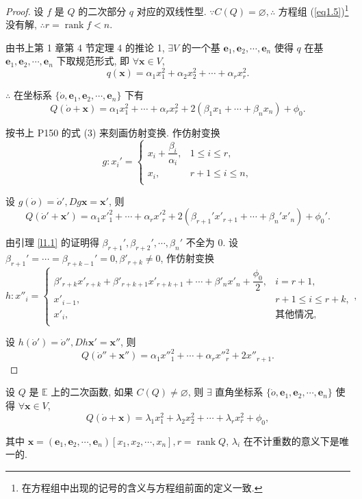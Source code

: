 \documentclass{ctexart}
\begin{document}
\begin{proof}
    设 $f$ 是 $Q$ 的二次部分 $q$ 对应的双线性型. $\because C(Q)=\varnothing,\therefore$ 方程组 (\ref{eq1.5})\footnote{在方程组中出现的记号的含义与方程组前面的定义一致.} 没有解, $\therefore r=\operatorname{rank}f<n$.

    由书上第 1 章第 4 节定理 4 的推论 1, $\exists V$ 的一个基 $\boldsymbol{e}_1,\boldsymbol{e}_2,\cdots,\boldsymbol{e}_n$ 使得 $q$ 在基 $\boldsymbol{e}_1,\boldsymbol{e}_2,\cdots,\boldsymbol{e}_n$ 下取规范形式, 即 $\forall\boldsymbol{x}\in V$,
    \[q(\boldsymbol{x})=\alpha_1x^2_1+\alpha_2x^2_2+\cdots+\alpha_rx^2_r.\]

    $\therefore$ 在坐标系 $\{\dot{o},\boldsymbol{e}_1,\boldsymbol{e}_2,\cdots,\boldsymbol{e}_n\}$ 下有
    \[Q(\dot{o}+\boldsymbol{x})=\alpha_1x^2_1+\cdots+\alpha_rx^2_r+2(\beta_1x_1+\cdots+\beta_nx_n)+\phi_0.\]

    按书上 P150 的式 (3) 来刻画仿射变换. 作仿射变换
    \[g:x_i'=\begin{cases}
        x_i+\dfrac{\beta_i}{\alpha_i}, & 1\leq i\leq r, \\
        x_i, & r+1\leq i\leq n, \\
    \end{cases}\]

    设 $g(\dot{o})=\dot{o}',Dg\boldsymbol{x}=\boldsymbol{x}'$, 则
    \[Q(\dot{o}'+\boldsymbol{x}')=\alpha_1x'^2_1+\cdots+\alpha_rx'^2_r+2(\beta_{r+1}'x'_{r+1}+\cdots+\beta_n'x'_n)+\phi_0'.\]

    由引理 \ref{l1.1} 的证明得 $\beta_{r+1}',\beta_{r+2}',\cdots,\beta_n'$ 不全为 $0$. 设 $\beta_{r+1}'=\cdots=\beta_{r+k-1}'=0,\beta'_{r+k}\neq0$, 作仿射变换
    \[h:x''_i=\begin{cases}
        \beta'_{r+k}x'_{r+k}+\beta'_{r+k+1}x'_{r+k+1}+\cdots+\beta'_nx'_n+\dfrac{\phi_0}{2}, & i=r+1, \\
        x'_{i-1}, & r+1\leq i\leq r+k, \\
        x'_i, & \text{其他情况}, \\
    \end{cases},\]

    设 $h(\dot{o}')=\dot{o}'',Dh\boldsymbol{x}'=\boldsymbol{x}''$, 则
    \[Q(\dot{o}''+\boldsymbol{x}'')=\alpha_1x''^2_1+\cdots+\alpha_rx''^2_r+2x''_{r+1}.\]
\end{proof}
\begin{theorem}
    设 $Q$ 是 $\mathbb{E}$ 上的二次函数, 如果 $C(Q)\neq\varnothing$, 则 $\exists$ 直角坐标系 $\{\dot{o},\boldsymbol{e}_1,\boldsymbol{e}_2,\cdots,\boldsymbol{e}_n\}$ 使得 $\forall\boldsymbol{x}\in V$,
    \[Q(\dot{o}+\boldsymbol{x})=\lambda_1x^2_1+\lambda_2x^2_2+\cdots+\lambda_rx^2_r+\phi_0,\]

    其中 $\boldsymbol{x}=(\boldsymbol{e}_1,\boldsymbol{e}_2,\cdots,\boldsymbol{e}_n)[x_1,x_2,\cdots,x_n],r=\operatorname{rank}Q$, $\lambda_i$ 在不计重数的意义下是唯一的.
\end{theorem}
\end{document}
